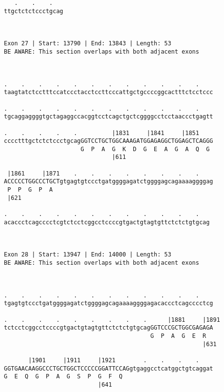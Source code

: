 \documentclass{article}
\begin{document}
\begin{Verbatim}
   .    .    .   
ttgctctctccctgcag
                 
                 
 
Exon 27 | Start: 13790 | End: 13843 | Length: 53
BE AWARE: This section overlaps with both adjacent exons



.    .    .    .    .    .    .    .    .    .    .    .    
taagtatctcctttccatccctacctccttcccattgctgccccggcactttctcctccc
                                                            
.    .    .    .    .    .    .    .    .    .    .    .    
tgcaggaggggtgctagaggccacggtcctcagctgctcggggcctcctaaccctgagtt
                                                            
.    .    .    .    .          |1831     |1841     |1851    
cccctttgctctctccctgcagGGTCCTGCTGGCAAAGATGGAGAGGCTGGAGCTCAGGG
                      G  P  A  G  K  D  G  E  A  G  A  Q  G 
                               |611                         
  
 |1861     |1871    .    .    .    .    .    .    .    .    
ACCCCCTGGCCCTGCTgtgagtgtccctgatggggagatctggggagcagaaaaggggag
 P  P  G  P  A                                              
 |621                                                       
  
.    .    .    .    .    .    .    .    .    .    .    .   
acaccctcagcccctcgtctcctcggcctccccgtgactgtagtgttctctctgtgcag
                                                           
                                                           
 
Exon 28 | Start: 13947 | End: 14000 | Length: 53
BE AWARE: This section overlaps with both adjacent exons



.    .    .    .    .    .    .    .    .    .    .    .    
tgagtgtccctgatggggagatctggggagcagaaaaggggagacaccctcagcccctcg
                                                            
.    .    .    .    .    .    .    .    .      |1881     |1891
tctcctcggcctccccgtgactgtagtgttctctctgtgcagGGTCCCGCTGGCGAGAGA
                                          G  P  A  G  E  R  
                                                         |631
  
       |1901     |1911     |1921        .    .    .    .    
GGTGAACAAGGCCCTGCTGGCTCCCCCGGATTCCAGgtgaggcctcatggctgtcaggat
G  E  Q  G  P  A  G  S  P  G  F  Q                          
                           |641                             
  

\end{Verbatim}
\end{document}
